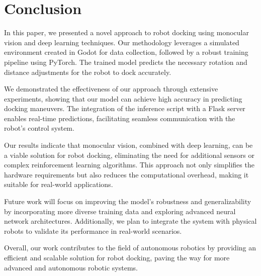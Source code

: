 \section{Conclusion}
In this paper, we presented a novel approach to robot docking using monocular vision and deep learning techniques. Our methodology leverages a simulated environment created in Godot for data collection, followed by a robust training pipeline using PyTorch. The trained model predicts the necessary rotation and distance adjustments for the robot to dock accurately.

We demonstrated the effectiveness of our approach through extensive experiments, showing that our model can achieve high accuracy in predicting docking maneuvers. The integration of the inference script with a Flask server enables real-time predictions, facilitating seamless communication with the robot's control system.

Our results indicate that monocular vision, combined with deep learning, can be a viable solution for robot docking, eliminating the need for additional sensors or complex reinforcement learning algorithms. This approach not only simplifies the hardware requirements but also reduces the computational overhead, making it suitable for real-world applications.

Future work will focus on improving the model's robustness and generalizability by incorporating more diverse training data and exploring advanced neural network architectures. Additionally, we plan to integrate the system with physical robots to validate its performance in real-world scenarios.

Overall, our work contributes to the field of autonomous robotics by providing an efficient and scalable solution for robot docking, paving the way for more advanced and autonomous robotic systems.
